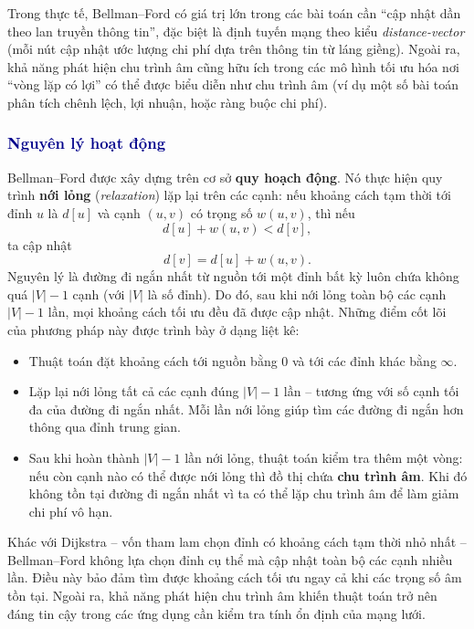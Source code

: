 \documentclass[14pt,a4paper]{report}
\begin{document}
Trong thực tế, Bellman--Ford có giá trị lớn trong các bài toán cần ``cập nhật dần theo lan truyền thông tin'', đặc biệt là định tuyến mạng theo kiểu \textit{distance-vector} (mỗi nút cập nhật ước lượng chi phí dựa trên thông tin từ láng giềng). Ngoài ra, khả năng phát hiện chu trình âm cũng hữu ích trong các mô hình tối ưu hóa nơi ``vòng lặp có lợi'' có thể được biểu diễn như chu trình âm (ví dụ một số bài toán phân tích chênh lệch, lợi nhuận, hoặc ràng buộc chi phí).

\subsubsection{\textcolor{darkblue}{Nguyên lý hoạt động}}

Bellman--Ford được xây dựng trên cơ sở \textbf{quy hoạch động}. Nó thực hiện quy trình \textbf{nới lỏng} (\textit{relaxation}) lặp lại trên các cạnh: nếu khoảng cách tạm thời tới đỉnh $u$ là $d[u]$ và cạnh $(u,v)$ có trọng số $w(u,v)$, thì nếu
\[
d[u] + w(u,v) < d[v],
\]
ta cập nhật
\[
d[v] = d[u] + w(u,v).
\]
Nguyên lý là đường đi ngắn nhất từ nguồn tới một đỉnh bất kỳ luôn chứa không quá $|V|-1$ cạnh (với $|V|$ là số đỉnh). Do đó, sau khi nới lỏng toàn bộ các cạnh $|V|-1$ lần, mọi khoảng cách tối ưu đều đã được cập nhật. Những điểm cốt lõi của phương pháp này được trình bày ở dạng liệt kê:

\begin{itemize}
    \item Thuật toán đặt khoảng cách tới nguồn bằng $0$ và tới các đỉnh khác bằng $\infty$.
    \item Lặp lại nới lỏng tất cả các cạnh đúng $|V|-1$ lần -- tương ứng với số cạnh tối đa của đường đi ngắn nhất. Mỗi lần nới lỏng giúp tìm các đường đi ngắn hơn thông qua đỉnh trung gian.
    \item Sau khi hoàn thành $|V|-1$ lần nới lỏng, thuật toán kiểm tra thêm một vòng: nếu còn cạnh nào có thể được nới lỏng thì đồ thị chứa \textbf{chu trình âm}. Khi đó không tồn tại đường đi ngắn nhất vì ta có thể lặp chu trình âm để làm giảm chi phí vô hạn.
\end{itemize}

Khác với Dijkstra -- vốn tham lam chọn đỉnh có khoảng cách tạm thời nhỏ nhất -- Bellman--Ford không lựa chọn đỉnh cụ thể mà cập nhật toàn bộ các cạnh nhiều lần. Điều này bảo đảm tìm được khoảng cách tối ưu ngay cả khi các trọng số âm tồn tại. Ngoài ra, khả năng phát hiện chu trình âm khiến thuật toán trở nên đáng tin cậy trong các ứng dụng cần kiểm tra tính ổn định của mạng lưới.
\end{document}

